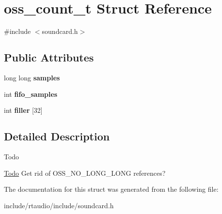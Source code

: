 \hypertarget{structoss__count__t}{}\section{oss\+\_\+count\+\_\+t Struct Reference}
\label{structoss__count__t}


{\ttfamily \#include $<$soundcard.\+h$>$}

\subsection*{Public Attributes}
\begin{DoxyCompactItemize}
\item 
long long {\bfseries samples}\hypertarget{structoss__count__t_ac9d071d2d6709b183afd22ba051a1620}{}\label{structoss__count__t_ac9d071d2d6709b183afd22ba051a1620}

\item 
int {\bfseries fifo\+\_\+samples}\hypertarget{structoss__count__t_a7eca01b0709bb28e8b8e910cc94db08d}{}\label{structoss__count__t_a7eca01b0709bb28e8b8e910cc94db08d}

\item 
int {\bfseries filler} \mbox{[}32\mbox{]}\hypertarget{structoss__count__t_a588be8d102257e0187e463bc98be5b61}{}\label{structoss__count__t_a588be8d102257e0187e463bc98be5b61}

\end{DoxyCompactItemize}


\subsection{Detailed Description}
\begin{DoxyRefDesc}{Todo}
\item[\hyperlink{todo__todo000002}{Todo}]Get rid of O\+S\+S\+\_\+\+N\+O\+\_\+\+L\+O\+N\+G\+\_\+\+L\+O\+NG references? \end{DoxyRefDesc}


The documentation for this struct was generated from the following file\+:\begin{DoxyCompactItemize}
\item 
include/rtaudio/include/soundcard.\+h\end{DoxyCompactItemize}
